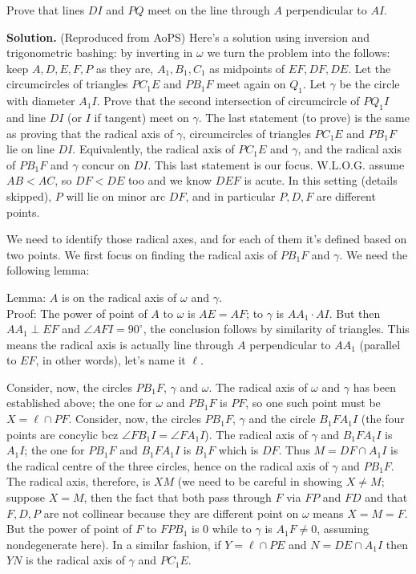 \documentclass[11pt,a4paper]{article}
\begin{document}
\begin{enumerate}
	Prove that lines $DI$ and $PQ$ meet on the line through $A$ perpendicular to $AI$.
	
	\textbf{Solution.} (Reproduced from AoPS) Here's a solution using inversion and trigonometric bashing: by inverting in $\omega$ we turn the problem into the follows: keep $A, D, E, F, P$ as they are, $A_1, B_1, C_1$ as midpoints of $EF, DF, DE$. Let the circumcircles of triangles $PC_1E$ and $PB_1F$ meet again on $Q_1$. Let $\gamma$ be the circle with diameter $A_1I$. Prove that the second intersection of circumcircle of $PQ_1I$ and line $DI$ (or $I$ if tangent) meet on $\gamma$. The last statement (to prove) is the same as proving that the radical axis of $\gamma$, circumcircles of triangles $PC_1E$ and $PB_1F$ lie on line $DI$. Equivalently, the radical axis of $PC_1E$ and $\gamma$, and the radical axis of $PB_1F$ and $\gamma$ concur on $DI$. This last statement is our focus. W.L.O.G. assume $AB<AC$, so $DF<DE$ too and we know $DEF$ is acute. In this setting (details skipped), $P$ will lie on minor arc $DF$, and in particular $P, D, F$ are different points.
	
	We need to identify those radical axes, and for each of them it's defined based on two points. We first focus on finding the radical axis of $PB_1F$ and $\gamma$. We need the following lemma:
	
	Lemma: $A$ is on the radical axis of $\omega$ and $\gamma$.\\
	Proof: The power of point of $A$ to $\omega$ is $AE=AF$; to $\gamma$ is $AA_1\cdot AI$. But then $AA_1\perp EF$ and $\angle AFI=90^{\circ}$, the conclusion follows by similarity of triangles. This means the radical axis is actually line through $A$ perpendicular to $AA_1$ (parallel to $EF$, in other words), let's name it $\ell$.
	
	Consider, now, the circles $PB_1F$, $\gamma$ and $\omega$. The radical axis of $\omega$ and $\gamma$ has been established above; the one for $\omega$ and $PB_1F$ is $PF$, so one such point must be $X=\ell\cap PF$. Consider, now, the circles $PB_1F$, $\gamma$ and the circle $B_1FA_1I$ (the four points are concylic bcz $\angle FB_1I=\angle FA_1I$). The radical axis of $\gamma$ and $B_1FA_1I$ is $A_1I$; the one for $PB_1F$ and $B_1FA_1I$ is $B_1F$ which is $DF$. Thus $M=DF\cap A_1I$ is the radical centre of the three circles, hence on the radical axis of $\gamma$ and $PB_1F$. The radical axis, therefore, is $XM$ (we need to be careful in showing $X\neq M$; suppose $X=M$, then the fact that both pass through $F$ via $FP$ and $FD$ and that $F, D, P$ are not collinear because they are different point on $\omega$ means $X=M=F$. But the power of point of $F$ to $FPB_1$ is 0 while to $\gamma$ is $A_1F\neq 0$, assuming nondegenerate here).
	In a similar fashion, if $Y=\ell\cap PE$ and $N=DE\cap A_1I$ then $YN$ is the radical axis of $\gamma$ and $PC_1E$.
	

\end{enumerate}
\end{document}
